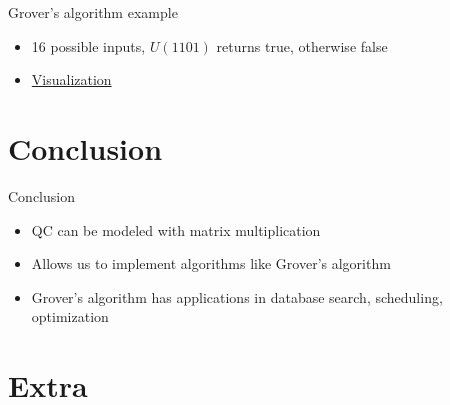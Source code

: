 \documentclass[14pt]{beamer}
\begin{document}
\begin{frame}{Grover's algorithm example}
\begin{itemize}
	\item 16 possible inputs, $U(1101)$ returns true, otherwise false
	\item \href{http://algorithmicassertions.com/quirk\#circuit={"cols":[["X","X","X","X"],["H","H","H","H"],["Chance4"],["Sample4"],["Z","\%E2\%80\%A2","\%E2\%97\%A6","\%E2\%80\%A2"],["H","H","H","H"],["Z","\%E2\%80\%A2","\%E2\%80\%A2","\%E2\%80\%A2"],["H","H","H","H"],["Chance4"],["Sample4"],["Z","\%E2\%80\%A2","\%E2\%97\%A6","\%E2\%80\%A2"],["H","H","H","H"],["Z","\%E2\%80\%A2","\%E2\%80\%A2","\%E2\%80\%A2"],["H","H","H","H"],["Chance4"],["Sample4"],["Z","\%E2\%80\%A2","\%E2\%97\%A6","\%E2\%80\%A2"],["H","H","H","H"],["Z","\%E2\%80\%A2","\%E2\%80\%A2","\%E2\%80\%A2"],["H","H","H","H"],["Chance4"],["Sample4"]]}}{Visualization}
\end{itemize}
\end{frame}

\section{Conclusion}
\begin{frame}{Conclusion}
\begin{itemize}
	\item QC can be modeled with matrix multiplication
	\item Allows us to implement algorithms like Grover's algorithm
	\item Grover's algorithm has applications in database search, scheduling, optimization
\end{itemize}
\end{frame}

\section{Extra}
\end{document}
